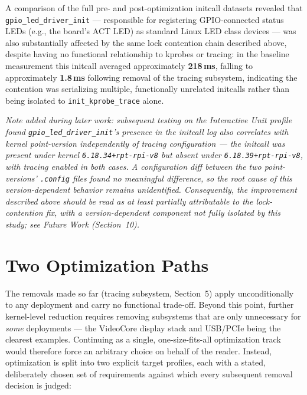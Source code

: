 \documentclass[11pt,a4paper]{article}
\begin{document}
A comparison of the full pre- and post-optimization initcall datasets revealed that \texttt{gpio\_led\_driver\_init} — responsible for registering GPIO-connected status LEDs (e.g., the board's ACT LED) as standard Linux LED class devices — was also substantially affected by the same lock contention chain described above, despite having no functional relationship to kprobes or tracing: in the baseline measurement this initcall averaged approximately \textbf{218\,ms}, falling to approximately \textbf{1.8\,ms} following removal of the tracing subsystem, indicating the contention was serializing multiple, functionally unrelated initcalls rather than being isolated to \texttt{init\_kprobe\_trace} alone.

\textit{Note added during later work: subsequent testing on the Interactive Unit profile found \texttt{gpio\_led\_driver\_init}'s presence in the initcall log also correlates with kernel point-version independently of tracing configuration — the initcall was present under kernel \texttt{6.18.34+rpt-rpi-v8} but absent under \texttt{6.18.39+rpt-rpi-v8}, with tracing enabled in both cases. A configuration diff between the two point-versions' \texttt{.config} files found no meaningful difference, so the root cause of this version-dependent behavior remains unidentified. Consequently, the improvement described above should be read as at least partially attributable to the lock-contention fix, with a version-dependent component not fully isolated by this study; see Future Work (Section~10).}





\section{Two Optimization Paths}

The removals made so far (tracing subsystem, Section~5) apply unconditionally to any deployment and carry no functional trade-off. Beyond this point, further kernel-level reduction requires removing subsystems that are only unnecessary for \textit{some} deployments — the VideoCore display stack and USB/PCIe being the clearest examples. Continuing as a single, one-size-fits-all optimization track would therefore force an arbitrary choice on behalf of the reader. Instead, optimization is split into two explicit target profiles, each with a stated, deliberately chosen set of requirements against which every subsequent removal decision is judged:
\end{document}
